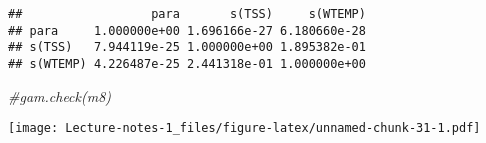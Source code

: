 \documentclass[
]{book}
\newenvironment{Shaded}{\begin{snugshade}}{\end{snugshade}}
\newcommand{\CommentTok}[1]{\textcolor[rgb]{0.56,0.35,0.01}{\textit{#1}}}
\begin{document}
\begin{verbatim}
##                  para       s(TSS)     s(WTEMP)
## para     1.000000e+00 1.696166e-27 6.180660e-28
## s(TSS)   7.944119e-25 1.000000e+00 1.895382e-01
## s(WTEMP) 4.226487e-25 2.441318e-01 1.000000e+00
\end{verbatim}

\begin{Shaded}
\begin{Highlighting}[]
\CommentTok{#gam.check(m8)}
\end{Highlighting}
\end{Shaded}

\texttt{[image: Lecture-notes-1\_files/figure-latex/unnamed-chunk-31-1.pdf]}

  
\end{document}
